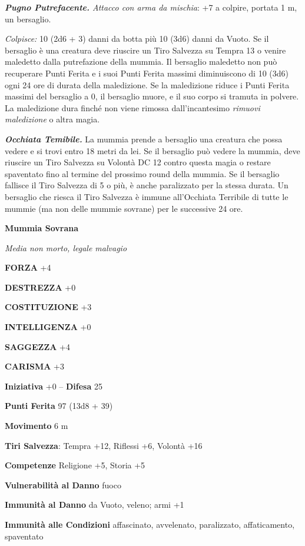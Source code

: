 \begin{multicols}{2}
	\textit{\textbf{Pugno Putrefacente.} Attacco con arma da mischia}: +7 a colpire, portata 1 m, un bersaglio.

	\textit{Colpisce:} 10 (2d6 + 3) danni da botta più 10 (3d6) danni da Vuoto. Se il bersaglio è una creatura deve riuscire un Tiro Salvezza su Tempra 13 o venire maledetto dalla putrefazione della mummia. Il bersaglio maledetto non può recuperare Punti Ferita e i suoi Punti Ferita massimi diminuiscono di 10 (3d6) ogni 24 ore di durata della maledizione. Se la maledizione riduce i Punti Ferita massimi del bersaglio a 0, il bersaglio muore, e il suo corpo si tramuta in polvere. La maledizione dura finché non viene rimossa dall'incantesimo \textit{rimuovi maledizione} o altra magia.

	\textit{\textbf{Occhiata Temibile.}} La mummia prende a bersaglio una creatura che possa vedere e si trovi entro 18 metri da lei. Se il bersaglio può vedere la mummia, deve riuscire un Tiro Salvezza su Volontà DC 12 contro questa magia o restare spaventato fino al termine del prossimo round della mummia. Se il bersaglio fallisce il Tiro Salvezza di 5 o più, è anche paralizzato per la stessa durata. Un bersaglio che riesca il Tiro Salvezza è immune all'Occhiata Terribile di tutte le mummie (ma non delle mummie sovrane) per le successive 24 ore.

	\medskip{}\textbf{Mummia Sovrana}

	\textit{Media non morto, legale malvagio}

	\textbf{FORZA} +4

	\textbf{DESTREZZA} +0

	\textbf{COSTITUZIONE} +3

	\textbf{INTELLIGENZA} +0

	\textbf{SAGGEZZA} +4

	\textbf{CARISMA} +3

	\textbf{Iniziativa} +0 -- \textbf{Difesa} 25

	\textbf{Punti Ferita} 97 (13d8 + 39)

	\textbf{Movimento} 6 m

	\textbf{Tiri Salvezza}: Tempra +12, Riflessi +6, Volontà +16

	\textbf{Competenze} Religione +5, Storia +5

	\textbf{Vulnerabilità al Danno} fuoco

	\textbf{Immunità al Danno} da Vuoto, veleno; armi +1

	\textbf{Immunità alle Condizioni} affascinato, avvelenato, paralizzato, affaticamento, spaventato


\end{multicols}
